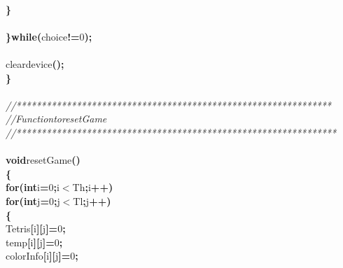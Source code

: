 \documentclass[a4paper, 10pt]{article}
\newcommand\SPC{\hspace*{0.6em}}
\newcommand{\CppAComment}[1]{\textit{\textcolor[rgb]{0.2,0.6,1}{#1}}}
\newcommand{\CppAIdentifier}[1]{#1}
\newcommand{\CppANumber}[1]{\textcolor[rgb]{0.5,0,0.5}{#1}}
\newcommand{\CppAReservedWord}[1]{\textbf{#1}}
\newcommand{\CppASpace}[1]{\colorbox[rgb]{1,1,1}{#1}}
\newcommand{\CppASymbol}[1]{\textbf{\textcolor[rgb]{1,0,0}{#1}}}
\begin{document}
\begin{ttfamily}
\\
\CppASpace{\SPC \SPC \SPC }\CppASymbol{\}}\\
\\
\CppASpace{\SPC }\CppASymbol{\}}\CppAReservedWord{while}\CppASymbol{(}\CppAIdentifier{choice}\CppASymbol{!=}\CppANumber{0}\CppASymbol{)}\CppASymbol{;}\\
\\
\CppASpace{\SPC }\CppAIdentifier{cleardevice}\CppASymbol{(}\CppASymbol{)}\CppASymbol{;}\\
\CppASymbol{\}}\\
\\
\CppAComment{//***************************************************************}\\
\CppAComment{//\SPC \SPC \SPC Function\SPC to\SPC reset\SPC Game}\\
\CppAComment{//****************************************************************}\\
\\
\CppAReservedWord{void}\CppASpace{\SPC }\CppAIdentifier{resetGame}\CppASymbol{(}\CppASymbol{)}\\
\CppASymbol{\{}\\
\CppASpace{\SPC }\CppAReservedWord{for}\CppASymbol{(}\CppAReservedWord{int}\CppASpace{\SPC }\CppAIdentifier{i}\CppASymbol{=}\CppANumber{0}\CppASymbol{;}\CppAIdentifier{i}\CppASymbol{$<$}\CppAIdentifier{Th}\CppASymbol{;}\CppAIdentifier{i}\CppASymbol{++}\CppASymbol{)}\\
\CppASpace{\SPC \SPC }\CppAReservedWord{for}\CppASymbol{(}\CppAReservedWord{int}\CppASpace{\SPC }\CppAIdentifier{j}\CppASymbol{=}\CppANumber{0}\CppASymbol{;}\CppAIdentifier{j}\CppASymbol{$<$}\CppAIdentifier{Tl}\CppASymbol{;}\CppAIdentifier{j}\CppASymbol{++}\CppASymbol{)}\\
\CppASpace{\SPC \SPC }\CppASymbol{\{}\\
\CppASpace{\SPC \SPC \SPC }\CppAIdentifier{Tetris}\CppASymbol{[}\CppAIdentifier{i}\CppASymbol{]}\CppASymbol{[}\CppAIdentifier{j}\CppASymbol{]}\CppASymbol{=}\CppANumber{0}\CppASymbol{;}\\
\CppASpace{\SPC \SPC \SPC }\CppAIdentifier{temp}\CppASymbol{[}\CppAIdentifier{i}\CppASymbol{]}\CppASymbol{[}\CppAIdentifier{j}\CppASymbol{]}\CppASymbol{=}\CppANumber{0}\CppASymbol{;}\\
\CppASpace{\SPC \SPC \SPC }\CppAIdentifier{colorInfo}\CppASymbol{[}\CppAIdentifier{i}\CppASymbol{]}\CppASymbol{[}\CppAIdentifier{j}\CppASymbol{]}\CppASymbol{=}\CppANumber{0}\CppASymbol{;}\\

\end{ttfamily}
\end{document}
